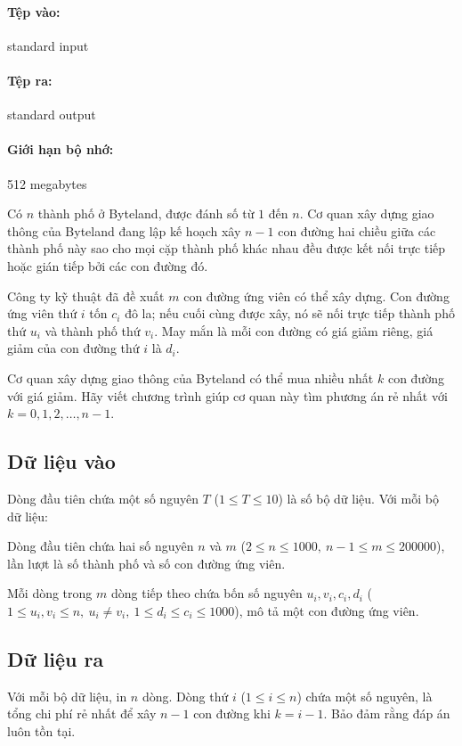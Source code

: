 \documentclass[11pt]{article}
\begin{document}
\paragraph{Tệp vào:} standard input
\paragraph{Tệp ra:} standard output
\paragraph{Giới hạn bộ nhớ:} 512 megabytes

Có \(n\) thành phố ở Byteland, được đánh số từ \(1\) đến \(n\). Cơ quan xây
dựng giao thông của Byteland đang lập kế hoạch xây \(n-1\) con đường hai
chiều giữa các thành phố này sao cho mọi cặp thành phố khác nhau đều được
kết nối trực tiếp hoặc gián tiếp bởi các con đường đó.

Công ty kỹ thuật đã đề xuất \(m\) con đường ứng viên có thể xây dựng. Con
đường ứng viên thứ \(i\) tốn \(c_i\) đô la; nếu cuối cùng được xây, nó sẽ nối
trực tiếp thành phố thứ \(u_i\) và thành phố thứ \(v_i\). May mắn là mỗi con
đường có giá giảm riêng, giá giảm của con đường thứ \(i\) là \(d_i\).

Cơ quan xây dựng giao thông của Byteland có thể mua nhiều nhất \(k\) con
đường với giá giảm. Hãy viết chương trình giúp cơ quan này tìm phương án rẻ
nhất với \(k=0,1,2,\ldots,n-1\).

\subsection*{Dữ liệu vào}

Dòng đầu tiên chứa một số nguyên \(T\) (\(1\le T\le 10\)) là số bộ dữ liệu.
Với mỗi bộ dữ liệu:

Dòng đầu tiên chứa hai số nguyên \(n\) và \(m\)
(\(2\le n\le 1000,\ n-1\le m\le 200000\)), lần lượt là số thành phố và số con
đường ứng viên.

Mỗi dòng trong \(m\) dòng tiếp theo chứa bốn số nguyên \(u_i,v_i,c_i,d_i\)
(\(1\le u_i,v_i\le n,\ u_i\ne v_i,\ 1\le d_i\le c_i\le 1000\)), mô tả một
con đường ứng viên.

\subsection*{Dữ liệu ra}

Với mỗi bộ dữ liệu, in \(n\) dòng. Dòng thứ \(i\) (\(1\le i\le n\)) chứa một
số nguyên, là tổng chi phí rẻ nhất để xây \(n-1\) con đường khi \(k=i-1\).
Bảo đảm rằng đáp án luôn tồn tại.
\end{document}
